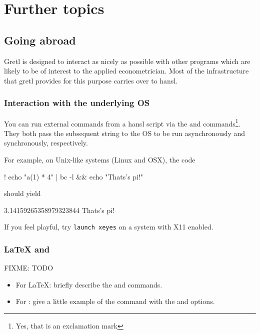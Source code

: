 
\chapter{Further topics}


\section{Going abroad}

Gretl is designed to interact as nicely as possible with other
programs which are likely to be of interest to the applied
econometrician. Most of the infrastructure that gretl provides for
this purpose carries over to hansl.

\subsection{Interaction with the underlying OS}

You can run external commands from a hansl script via the 
and \cmd{!} commands\footnote{Yes, that is an exclamation mark}. They
both pass the subsequent string to the OS to be run asynchronously
and synchronously, respectively.

For example, on Unix-like systems (Linux and OSX), the code
\begin{code}
! echo "a(1) * 4" | bc -l && echo "Thats's pi!"
\end{code}

should yield

\begin{code}
3.14159265358979323844
Thats's pi!
\end{code}

If you feel playful, try \texttt{launch xeyes} on a system with X11
enabled.

\subsection{\LaTeX{} and }

FIXME: TODO

\begin{itemize}
\item For \LaTeX: briefly describe the  and
   commands.
\item For : give a little example of the 
  command with the  and  options.
\end{itemize}


